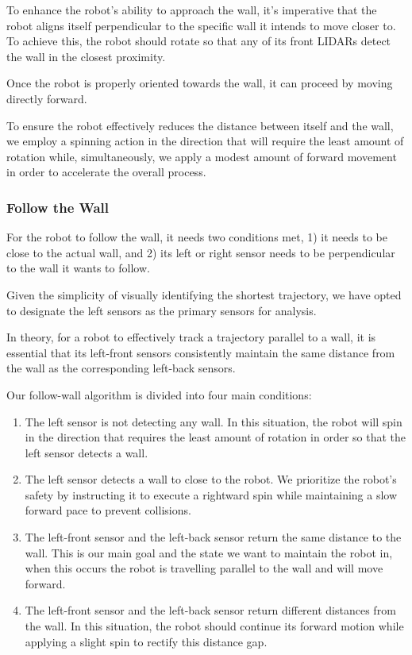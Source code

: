 \documentclass[conference]{IEEEtran}
\begin{document}
To enhance the robot's ability to approach the wall, it's imperative that the robot aligns itself perpendicular to the specific wall it intends to move closer to. To achieve this, the robot should rotate so that any of its front LIDARs detect the wall in the closest proximity.

Once the robot is properly oriented towards the wall, it can proceed by moving directly forward.

To ensure the robot effectively reduces the distance between itself and the wall, we employ a spinning action in the direction that will require the least amount of rotation while, simultaneously, we apply a modest amount of forward movement in order to accelerate the overall process.

\subsubsection{Follow the Wall}
For the robot to follow the wall, it needs two conditions met, 1) it needs to be close to the actual wall, and 2) its left or right sensor needs to be perpendicular to the wall it wants to follow.

Given the simplicity of visually identifying the shortest trajectory, we have opted to designate the left sensors as the primary sensors for analysis.

In theory, for a robot to effectively track a trajectory parallel to a wall, it is essential that its left-front sensors consistently maintain the same distance from the wall as the corresponding left-back sensors.

Our follow-wall algorithm is divided into four main conditions:
\begin{enumerate}
    \item The left sensor is not detecting any wall. In this situation, the robot will spin in the direction that requires the least amount of rotation in order so that the left sensor detects a wall.
    \item The left sensor detects a wall to close to the robot. We prioritize the robot's safety by instructing it to execute a rightward spin while maintaining a slow forward pace to prevent collisions.
    \item The left-front sensor and the left-back sensor return the same distance to the wall. This is our main goal and the state we want to maintain the robot in, when this occurs the robot is travelling parallel to the wall and will move forward.
    \item The left-front sensor and the left-back sensor return different distances from the wall. In this situation, the robot should continue its forward motion while applying a slight spin to rectify this distance gap.
\end{enumerate}
\end{document}
